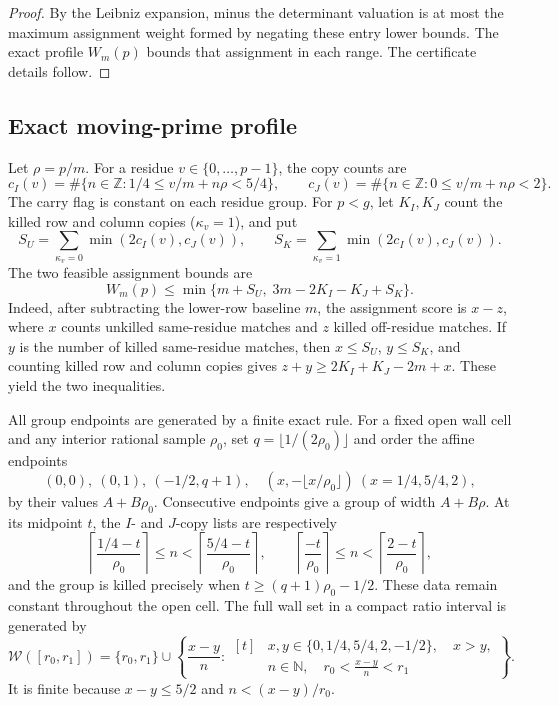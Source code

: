 \begin{proof}
By the Leibniz expansion, minus the determinant valuation is at most the
maximum assignment weight formed by negating these entry lower bounds.
The exact profile $W_m(p)$ bounds that assignment in each range.  The
certificate details follow.
\end{proof}

\subsection{Exact moving-prime profile}

Let $\rho=p/m$.  For a residue $v\in\{0,\ldots,p-1\}$, the copy counts are
\[
 c_I(v)=\#\{n\in\mathbb Z:1/4\le v/m+n\rho<5/4\},\qquad
 c_J(v)=\#\{n\in\mathbb Z:0\le v/m+n\rho<2\}.
\]
The carry flag is constant on each residue group.  For $p<g$, let $K_I,K_J$
count the killed row and column copies ($\kappa_v=1$), and put
\[
 S_U=\sum_{\kappa_v=0}\min(2c_I(v),c_J(v)),\qquad
 S_K=\sum_{\kappa_v=1}\min(2c_I(v),c_J(v)).
\]
The two feasible assignment bounds are
\begin{equation}\label{eq:p0-low-W}
 W_m(p)\le\min\{m+S_U,\;3m-2K_I-K_J+S_K\}.
\end{equation}
Indeed, after subtracting the lower-row baseline $m$, the assignment score is
$x-z$, where $x$ counts unkilled same-residue matches and $z$ killed
off-residue matches.  If $y$ is the number of killed same-residue matches,
then $x\le S_U$, $y\le S_K$, and counting killed row and column copies gives
$z+y\ge2K_I+K_J-2m+x$.  These yield the two inequalities.

All group endpoints are generated by a finite exact rule.  For a fixed open
wall cell and any interior rational sample $\rho_0$, set
$q=\lfloor1/(2\rho_0)\rfloor$ and order the affine endpoints
\[
 (0,0),\ (0,1),\ (-1/2,q+1),\quad
 (x,-\lfloor x/\rho_0\rfloor)\ (x=1/4,5/4,2),
\]
by their values $A+B\rho_0$.  Consecutive endpoints give a group of width
$A+B\rho$.  At its midpoint $t$, the $I$- and $J$-copy lists are respectively
\[
 \left\lceil\frac{1/4-t}{\rho_0}\right\rceil\le n<
 \left\lceil\frac{5/4-t}{\rho_0}\right\rceil,
 \qquad
 \left\lceil\frac{-t}{\rho_0}\right\rceil\le n<
 \left\lceil\frac{2-t}{\rho_0}\right\rceil,
\]
and the group is killed precisely when
$t\ge(q+1)\rho_0-1/2$.  These data remain constant throughout the open cell.
The full wall set in a compact ratio interval is generated by
\[
\mathcal W([r_0,r_1])=\{r_0,r_1\}\cup
\left\{\frac{x-y}{n}:\begin{aligned}[t]
&x,y\in\{0,1/4,5/4,2,-1/2\},\quad x>y,\\
&n\in\mathbb N,\quad r_0<\frac{x-y}{n}<r_1
\end{aligned}\right\}.
\]
It is finite because $x-y\le5/2$ and $n<(x-y)/r_0$.

